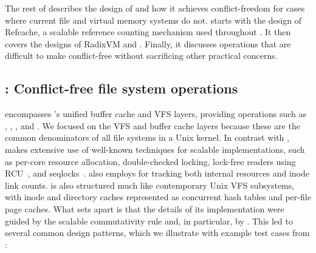 The rest of  describes
the design of \sys and how it achieves conflict-freedom for cases
where current file and virtual memory systems do not.
%
 starts with the design of Refcache, a scalable reference
counting mechanism used throughout \sys.  It then covers the designs
of RadixVM and \fs.  Finally, it discusses operations that are
difficult to make conflict-free without sacrificing other practical
concerns.





\subsection{\fs: Conflict-free file system operations}


\fs encompasses \sys's unified buffer cache and VFS layers, providing
operations such as , , , and
.  We focused on the VFS and buffer cache layers because
these are the common denominators of all file systems in a Unix
kernel.
%
In contrast with \vm,
\fs makes extensive use of well-known techniques for scalable
implementations, such as per-core resource
allocation, double-checked locking, lock-free readers using
RCU~\cite{rcu:linux},
and seqlocks~\cite[\S6]{lameter:linuxsync}.
%
\fs also employs  for tracking both internal resources and
inode link counts.
%
\fs is also structured much like contemporary Unix VFS subsystems,
with inode and directory caches represented as concurrent hash tables
and per-file page caches.
%
What sets \fs apart is that the details of its implementation were
guided by the scalable commutativity rule and, in particular, by
\tool.
%
This led to several common design patterns, which we illustrate with
example test cases from \tool{}:
%


